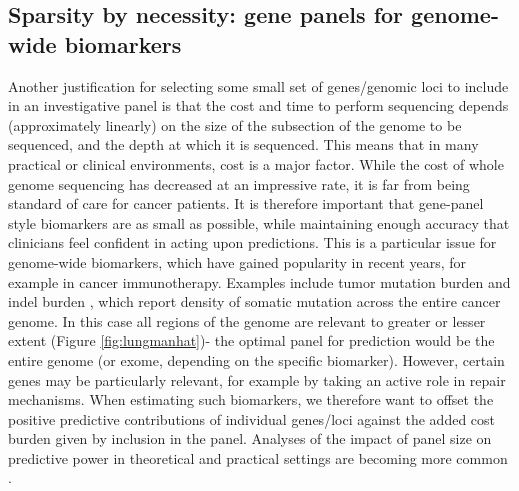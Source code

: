 \documentclass[thesis.tex]{subfiles}
\begin{document}
\subsection{Sparsity by necessity: gene panels for genome-wide biomarkers}
Another justification for selecting some small set of genes/genomic loci to include in an investigative panel is that the cost and time to perform sequencing depends (approximately linearly) on the size of the subsection of the genome to be sequenced, and the depth at which it is sequenced. This means that in many practical or clinical environments, cost is a major factor. While the cost of whole genome sequencing has decreased at an impressive rate, it is far from being standard of care for cancer patients. It is therefore important that gene-panel style biomarkers are as small as possible, while maintaining enough accuracy that clinicians feel confident in acting upon predictions. This is a particular issue for genome-wide biomarkers, which have gained popularity in recent years, for example in cancer immunotherapy. Examples include tumor mutation burden  \citep{cao_high_2019, samstein_tumor_2019, zhu_association_2019} and indel burden \citep{turajlic_insertion-and-deletion-derived_2017, wu_tumor_2019}, which report density of somatic mutation across the entire cancer genome. In this case all regions of the genome are relevant to greater or lesser extent (Figure \ref{fig:lungmanhat})- the optimal panel for prediction would be the entire genome (or exome, depending on the specific biomarker). However, certain genes may be particularly relevant, for example by taking an active role in  repair mechanisms. When estimating such biomarkers, we therefore want to offset the positive predictive contributions of individual genes/loci against the added cost burden given by inclusion in the panel. Analyses of the impact of panel size on predictive power in theoretical and practical settings are becoming more common \citep{budczies_optimizing_2019}.
\end{document}
